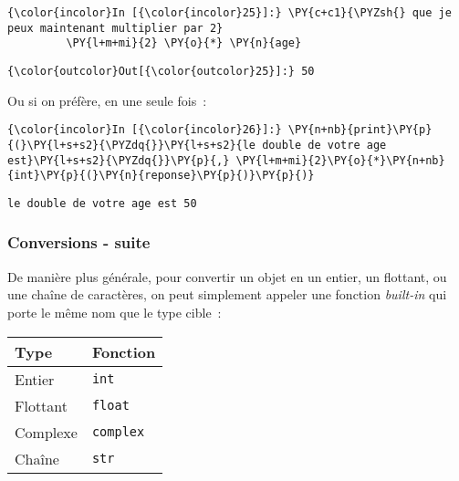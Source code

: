     \begin{Verbatim}[commandchars=\\\{\},frame=single,framerule=0.3mm,rulecolor=\color{cellframecolor}]
{\color{incolor}In [{\color{incolor}25}]:} \PY{c+c1}{\PYZsh{} que je peux maintenant multiplier par 2}
         \PY{l+m+mi}{2} \PY{o}{*} \PY{n}{age}
\end{Verbatim}


\begin{Verbatim}[commandchars=\\\{\},frame=single,framerule=0.3mm,rulecolor=\color{cellframecolor}]
{\color{outcolor}Out[{\color{outcolor}25}]:} 50
\end{Verbatim}
            
    Ou si on préfère, en une seule fois~:

    \begin{Verbatim}[commandchars=\\\{\},frame=single,framerule=0.3mm,rulecolor=\color{cellframecolor}]
{\color{incolor}In [{\color{incolor}26}]:} \PY{n+nb}{print}\PY{p}{(}\PY{l+s+s2}{\PYZdq{}}\PY{l+s+s2}{le double de votre age est}\PY{l+s+s2}{\PYZdq{}}\PY{p}{,} \PY{l+m+mi}{2}\PY{o}{*}\PY{n+nb}{int}\PY{p}{(}\PY{n}{reponse}\PY{p}{)}\PY{p}{)}
\end{Verbatim}


    \begin{Verbatim}[commandchars=\\\{\},frame=single,framerule=0.3mm,rulecolor=\color{cellframecolor}]
le double de votre age est 50
\end{Verbatim}

    \hypertarget{conversions---suite}{%
\subsubsection{Conversions - suite}\label{conversions---suite}}

    De manière plus générale, pour convertir un objet en un entier, un
flottant, ou une chaîne de caractères, on peut simplement appeler une
fonction \emph{built-in} qui porte le même nom que le type cible~:

\begin{longtable}[]{@{}ll@{}}
\toprule
Type & Fonction\tabularnewline
\midrule
\endhead
Entier & \texttt{int}\tabularnewline
Flottant & \texttt{float}\tabularnewline
Complexe & \texttt{complex}\tabularnewline
Chaîne & \texttt{str}\tabularnewline
\bottomrule
\end{longtable}


